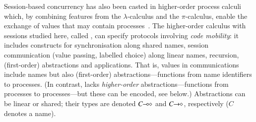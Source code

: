 \documentclass[preprint,11pt]{elsarticle}
\begin{document}
Session-based concurrency has also been casted in {higher-order} process
calculi which, by combining features from the $\lambda$-calculus and the $\pi$-calculus, 
enable the exchange of values 
that may contain processes~\cite{tlca07,DBLP:journals/jfp/GayV10}. 
The higher-order calculus with sessions studied here, called \HOp,
can specify protocols involving \emph{code mobility}: it includes
constructs for 
synchronisation along shared names, 
session communication (value passing, labelled choice) along linear names,
recursion, 
 (first-order) abstractions 
 and applications.
 That is, 
 values in communications include names but also (first-order) abstractions---functions from name identifiers to processes. 
 (In contrast, \HOp lacks \emph{higher-order} abstractions---functions from processes to processes---but these can be encoded, see below.)
Abstractions can be linear or shared; their types are  denoted $C\!\! \multimap\!\! \diamond$ and $C\!\! \rightarrow\!\! \diamond$, respectively ($C$ 
denotes a name). 

\end{document}
